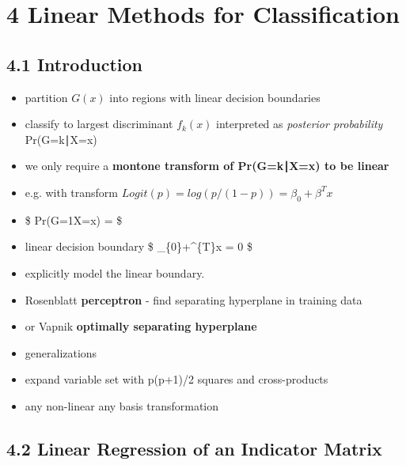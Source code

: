 \documentclass[11pt]{article}
\providecommand{\tightlist}{%
      \setlength{\itemsep}{0pt}\setlength{\parskip}{0pt}}
\begin{document}
    \section{4 Linear Methods for
Classification}\label{linear-methods-for-classification}

\subsection{4.1 Introduction}\label{introduction}

\begin{itemize}
\tightlist
\item
  partition \(G(x)\) into regions with linear decision boundaries
\item
  classify to largest discriminant \(f_{k}(x)\) interpreted as
  \emph{posterior probability} Pr(G=k∣X=x)
\item
  we only require a \textbf{montone transform of Pr(G=k∣X=x) to be
  linear}
\item
  e.g. with transform \(Logit(p)=log(p/(1-p))=\beta_{0}+\beta^{T}x\)
\item
  \$ Pr(G=1\textbar{}X=x) =
   \$
\item
  linear decision boundary \$ \beta\_\{0\}+\beta\^{}\{T\}x = 0 \$
\item
  explicitly model the linear boundary.
\item
  Rosenblatt \textbf{perceptron} - find separating hyperplane in
  training data
\item
  or Vapnik \textbf{optimally separating hyperplane}
\item
  generalizations
\item
  expand variable set with p(p+1)/2 squares and cross-products
\item
  any non-linear any basis transformation
\end{itemize}

\subsection{4.2 Linear Regression of an Indicator
Matrix}\label{linear-regression-of-an-indicator-matrix}
\end{document}
